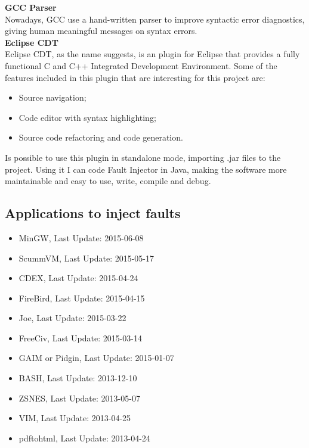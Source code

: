 \textbf{GCC Parser}\\

Nowadays, GCC use a hand-written parser to improve syntactic error diagnostics, giving human meaningful messages on syntax errors.\\

\textbf{Eclipse CDT}\\

Eclipse CDT, as the name suggests, is an plugin for Eclipse that provides a fully functional C and C++ Integrated Development Environment.
Some of the features included in this plugin that are interesting for this project are:
\begin{itemize}
	\item Source navigation;
	\item Code editor with syntax highlighting;
	\item Source code refactoring and code generation.
\end{itemize}

Is possible to use this plugin in standalone mode, importing .jar files to the project.
Using it I can code Fault Injector in Java, making the software more maintainable and easy to use, write, compile and debug.
\\





\subsection{Applications to inject faults}


\begin{itemize}
	\item MinGW, Last Update: 2015-06-08
	\item ScummVM, Last Update: 2015-05-17
	\item CDEX, Last Update: 2015-04-24
	\item FireBird, Last Update: 2015-04-15
	\item Joe, Last Update: 2015-03-22
	\item FreeCiv, Last Update: 2015-03-14
	\item GAIM or Pidgin, Last Update: 2015-01-07
	\item BASH, Last Update: 2013-12-10
	\item ZSNES, Last Update: 2013-05-07
	\item VIM, Last Update: 2013-04-25
	\item pdftohtml, Last Update: 2013-04-24
\end{itemize}

